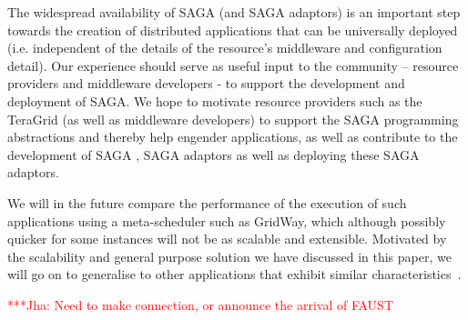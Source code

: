\documentclass[conference,final]{IEEEtran}
\newcommand{\jhanote}[1]{ {\textcolor{red} { ***Jha: #1 }}}
\newcommand{\jhanote}[1]{}
\begin{document}
The widespread availability of SAGA (and SAGA adaptors) is an
important step towards the creation of distributed applications that
can be universally deployed (i.e.  independent of the details of the
resource's middleware and configuration detail).  Our experience
should serve as useful input to the community -- resource providers
and middleware developers - to support the development and deployment
of SAGA.  We hope to motivate  resource providers such as the TeraGrid
(as well as middleware developers) to support the SAGA programming
abstractions and thereby help engender applications, as well as
contribute to the development of SAGA , SAGA adaptors as well as
deploying these SAGA adaptors.

We will in the future compare the performance of the execution of such
applications using a meta-scheduler such as GridWay, which although
possibly quicker for some instances will not be as scalable and
extensible. Motivated by the scalability and general purpose solution
we have discussed in this paper, we will go on to generalise to other
applications that exhibit similar characteristics~\cite{nature99}.

\jhanote{Need to make connection, or announce the arrival of FAUST}








\end{document}
